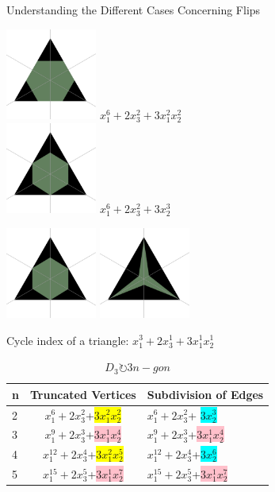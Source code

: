 \documentclass{beamer}
\begin{document}
\begin{frame}{Understanding the Different Cases Concerning Flips}

\includegraphics[width=3cm]{newtriangle_copya.jpg}
$x_1^6+2x_3^2+3x_1^2x_2^2$\\
\includegraphics[width=3cm]{newtriangle_copy1.jpg}
$x_1^6+2x_3^2+ 3x_2^3$\\
\end{frame}

\begin{frame}
\includegraphics[width=3cm]{newtriangle_copy1.jpg}
\mapsto
\includegraphics[width=3cm]{newtriangle_copyb.jpg}
\end{frame}

\begin{frame}
Cycle index of a triangle:
$x_1^3+2x_3^1+3x_1^1 x_2^1$\\

\begin{table}
\centering 
\begin{tabular}{l|c|l}
n & Truncated Vertices & Subdivision of Edges\\ \hline
2 & $x_1^6+2x_3^2$+\colorbox{yellow}{$3x_1^2x_2^2$} & $x_1^6+2x_3^2$+ \colorbox{cyan}{$3x_2^3$}\\
3 & $x_1^9+2x_3^3$+\colorbox{pink}{$3x_1^1x_2^4$}  &  $x_1^9+2x_3^3$+\colorbox{pink}{$3x_1^1x_2^4$}\\
4 & $x_1^12+2x_3^4$+\colorbox{yellow}{$3x_1^2x_2^5$} & $x_1^12+2x_3^4$+\colorbox{cyan}{$3x_2^6$}\\
5& $x_1^15+2x_3^5$+\colorbox{pink}{$3x_1^1x_2^7$} & $x_1^15+2x_3^5$+\colorbox{pink}{$3x_1^1x_2^7$}\\
\end{tabular}
\caption{$D_3 \circlearrowright 3n-gon$}
\end{table}
\end{frame}
\end{document}

